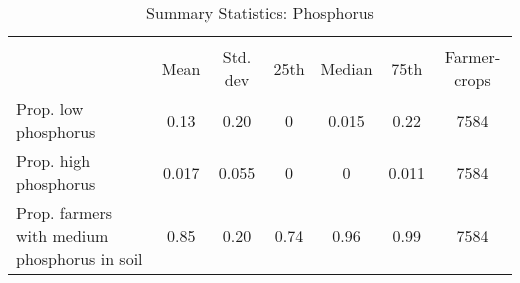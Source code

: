 \begin{table}[htbp]\centering
\def\sym#1{\ifmmode^{#1}\else\(^{#1}\)\fi}
\caption{Summary Statistics: Phosphorus\label{tab:sumstats}}
\begin{tabular}{l*{1}{cccccc}}
\toprule
                    &\multicolumn{6}{c}{}                                                         \\
                    &        Mean&    Std. dev&        25th&      Median&        75th&Farmer-crops\\
\midrule
Prop. low phosphorus&        0.13&        0.20&           0&       0.015&        0.22&        7584\\
Prop. high phosphorus&       0.017&       0.055&           0&           0&       0.011&        7584\\
Prop. farmers with medium phosphorus in soil&        0.85&        0.20&        0.74&        0.96&        0.99&        7584\\
\bottomrule
\end{tabular}
\end{table}
